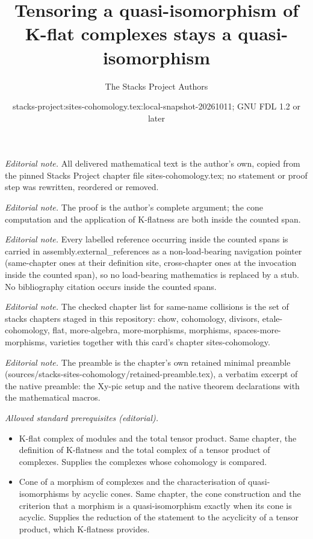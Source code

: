 \documentclass[10pt,a4paper]{amsart}
\title{Tensoring a quasi-isomorphism of K-flat complexes stays a quasi-isomorphism}
\author{The Stacks Project Authors}
\date{stacks-project:sites-cohomology.tex:local-snapshot-20261011; GNU FDL 1.2 or later}
\theoremstyle{plain}
\theoremstyle{definition}
\theoremstyle{remark}
\numberwithin{equation}{subsection}
\begin{document}
\maketitle
\noindent\textit{Editorial note.} All delivered mathematical text is the author's own, copied from the pinned Stacks Project chapter file sites-cohomology.tex; no statement or proof step was rewritten, reordered or removed.\par\medskip
\noindent\textit{Editorial note.} The proof is the author's complete argument; the cone computation and the application of K-flatness are both inside the counted span.\par\medskip
\noindent\textit{Editorial note.} Every labelled reference occurring inside the counted spans is carried in assembly.external\_references as a non-load-bearing navigation pointer (same-chapter ones at their definition site, cross-chapter ones at the invocation inside the counted span), so no load-bearing mathematics is replaced by a stub. No bibliography citation occurs inside the counted spans.\par\medskip
\noindent\textit{Editorial note.} The checked chapter list for same-name collisions is the set of stacks chapters staged in this repository: chow, cohomology, divisors, etale-cohomology, flat, more-algebra, more-morphisms, morphisms, spaces-more-morphisms, varieties together with this card's chapter sites-cohomology.\par\medskip
\noindent\textit{Editorial note.} The preamble is the chapter's own retained minimal preamble (sources/stacks-sites-cohomology/retained-preamble.tex), a verbatim excerpt of the native preamble: the Xy-pic setup and the native theorem declarations with the mathematical macros.\par\medskip
\noindent\textit{Allowed standard prerequisites (editorial).}\begin{itemize}
\item K-flat complex of modules and the total tensor product. Same chapter, the definition of K-flatness and the total complex of a tensor product of complexes. Supplies the complexes whose cohomology is compared.
\item Cone of a morphism of complexes and the characterisation of quasi-isomorphisms by acyclic cones. Same chapter, the cone construction and the criterion that a morphism is a quasi-isomorphism exactly when its cone is acyclic. Supplies the reduction of the statement to the acyclicity of a tensor product, which K-flatness provides.
\end{itemize}\medskip
\end{document}
